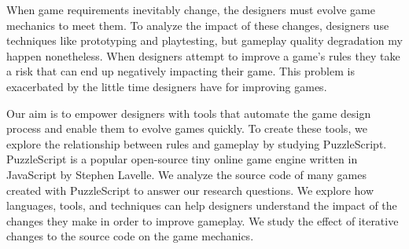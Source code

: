 When game requirements inevitably change, the designers must evolve game mechanics to meet them. To analyze the impact of these changes, designers use techniques like prototyping and playtesting, but gameplay quality degradation my happen nonetheless. When designers attempt to improve a game's rules they take a risk that can end up negatively impacting their game. This problem is exacerbated by the little time designers have for improving games.




Our aim is to empower designers with tools that automate the game design process and enable them to evolve games quickly. To create these tools, we explore the relationship between rules and gameplay by studying PuzzleScript. PuzzleScript is a popular open-source tiny online game engine\cite{8901975} written in JavaScript by Stephen Lavelle. We analyze the source code of many games created with PuzzleScript to answer our research questions. We explore how languages, tools, and techniques can help designers understand the impact of the changes they make in order to improve gameplay. We study the effect of iterative changes to the source code on the game mechanics.





